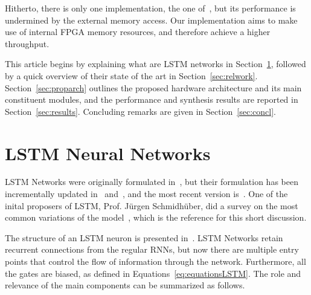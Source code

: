 \documentclass[conference]{IEEEtran}
\begin{document}
Hitherto, there is only one implementation, the one of~\cite{Chang15}, but its performance is undermined
by the external memory access. Our implementation aims to make use of internal FPGA memory resources,
and therefore achieve a higher throughput.

This article begins by explaining what are LSTM networks  in Section~\ref{sec:lstmnn}, followed by a quick overview of their state
of the art in Section~\ref{sec:relwork}. Section~\ref{sec:proparch} outlines the proposed
hardware architecture and its main constituent modules, and the performance and synthesis
results are reported in Section~\ref{sec:results}. Concluding remarks are given in
Section~\ref{sec:concl}.

\section{LSTM Neural Networks}\label{sec:lstmnn}
LSTM Networks were originally formulated in~\cite{Hoch97}, but their formulation has been incrementally
updated in~\cite{Gers00} and~\cite{Gers2000}, and the most recent version is~\cite{Graves05}.
One of the inital proposers of LSTM, Prof. Jürgen Schmidhüber, did a survey on the most common variations
of the model~\cite{Greff15}, which is the reference for this short discussion.

The structure of an LSTM neuron is presented in~\cite{Greff15}. LSTM Networks retain recurrent connections from the regular RNNs, but now there are multiple entry points
that control the flow of information through the network. Furthermore, all the
gates are biased, as defined in Equations~\ref{eq:equationsLSTM}. The role and relevance of the main components can
be summarized as follows.
\end{document}
